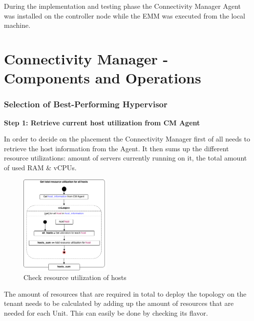 During the implementation and testing phase the Connectivity Manager Agent was installed on the controller node while the EMM was executed from the local machine.

\section{Connectivity Manager - Components and Operations}

\subsubsection{Selection of Best-Performing Hypervisor}


\textbf{Step 1: Retrieve current host utilization from CM Agent}

In order to decide on the placement the Connectivity Manager first of all needs to retrieve the host information from the Agent. It then sums up the different resource utilizations: amount of servers currently running on it, the total amount of used RAM \& vCPUs.
\begin{figure}[H]
\centering

\includegraphics[width=0.4\textwidth]{images/implementation/cm_get_host_utilization}

\caption{Check resource utilization of hosts}
\end{figure}

The amount of resources that are required in total to deploy the topology on the tenant needs to be calculated by adding up the amount of resources that are needed for each Unit. This can easily be done by checking its flavor.

